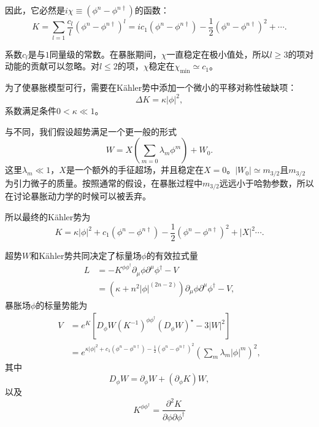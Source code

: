 因此，它必然是$i\chi \equiv (\phi^n - \phi^{n\dagger})$的函数：
\begin{equation}
    K = \sum_{l=1}\frac{c_l}{l}{\left(\phi^n-\phi^{n\dagger}\right)}^l
    =
    i c_1(\phi^n-\phi^{n\dagger})-\frac{1}{2}{\left(\phi^n-\phi^{n\dagger}\right)}^2+\cdots.
\end{equation}

系数$c_l$是与$1$同量级的常数。在暴胀期间，$\chi$一直稳定在极小值处，所以$l\ge
3$的项对动能的贡献可以忽略\citep{takahashi2010linear}。对$l\le2$的项，$\chi$稳定在$\chi_{\text{min}}\simeq
c_1$。

为了使暴胀模型可行，需要在K\"ahler势中添加一个微小的平移对称性破缺项：
\begin{equation}
    \Delta{K} = \kappa \left|\phi\right|^2,
\end{equation}
系数满足条件$0< \kappa \ll 1$。

与\citep{nakayama2010running}不同，我们假设超势满足一个更一般的形式\citep{nakayama2013polynomial,kawasaki2000natural,kawasaki2001natural,kallosh2010new,kallosh2011general}
\begin{equation}
    W = X\left(\sum_{m=0}\lambda_m\phi^m\right)+W_0.
\end{equation}
这里$\lambda_m\ll
1$，$X$是一个额外的手征超场，并且稳定在$X=0$。$\left|W_0\right|\simeq
m_{3/2}$且$m_{3/2}$为引力微子的质量。按照通常的假设，在暴胀过程中$m_{3/2}$远远小于哈勃参数，所以在讨论暴胀动力学的时候可以被丢弃。

所以最终的K\"ahler势为
\begin{equation}
    K = \kappa |\phi|^2 + c_1(\phi^n-\phi^{n\dagger}) -
    \frac{1}{2}{(\phi^n-\phi^{n\dagger})}^2 + |X|^2\cdots.
\end{equation}

超势$W$和K\"ahler势共同决定了标量场$\phi$的有效拉式量
\begin{equation}
\begin{split}\label{eq:lagrangian-with-running-kinetic-term}
L &= -K^{\phi\phi^\dagger} \partial_\mu\phi\partial^\mu\phi^\dagger
- V \\
  & = (\kappa + n^2|\phi|^{(2n-2)})
  \partial_\mu \phi \partial^\mu \phi^\dagger - V,
\end{split}
\end{equation}
暴胀场$\phi$的标量势能为
\begin{equation}
\begin{split}
V &= e^K \left[
    D_\phi W{(K^{-1})}^{\phi\phi^\dagger}{(D_\phi W)}^{\star} - 3|W|^2 
    \right]\\
  &=
  e^{\kappa|\phi|^2+c_1(\phi^n-\phi^{n\dagger})-\frac{1}{2}{(\phi^n-\phi^{n\dagger})}^2}{(\sum_m
  \lambda_m|\phi|^m)}^2,
\end{split}
\end{equation}
其中
\begin{equation}
    D_\phi W = \partial_\phi W + (\partial_\phi K) W,
\end{equation}
以及
\begin{equation}
    K^{\phi\phi^\dagger} = \frac{\partial^2 K}{\partial\phi
    \partial\phi^\dagger}
\end{equation}

